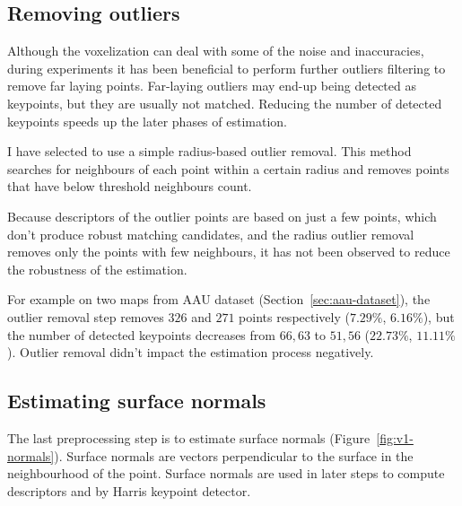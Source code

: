 \subsection{Removing outliers}
\label{sec:outlier-removal}

Although the voxelization can deal with some of the noise and inaccuracies, during experiments it has been beneficial to perform further outliers filtering to remove far laying points. Far-laying outliers may end-up being detected as keypoints, but they are usually not matched. Reducing the number of detected keypoints speeds up the later phases of estimation.

I have selected to use a simple radius-based outlier removal. This method searches for neighbours of each point within a certain radius and removes points that have below threshold neighbours count.

Because descriptors of the outlier points are based on just a few points, which don't produce robust matching candidates, and the radius outlier removal removes only the points with few neighbours, it has not been observed to reduce the robustness of the estimation.

For example on two maps from \gls{AAU} dataset (Section~\ref{sec:aau-dataset}), the outlier removal step removes $326$ and $271$ points respectively ($7.29\%$, $6.16\%$), but the number of detected keypoints decreases from $66, 63$ to $51, 56$ ($22.73\%$, $11.11\%$). Outlier removal didn't impact the estimation process negatively.

\subsection{Estimating surface normals}
\label{sec:normal-estimation}

The last preprocessing step is to estimate surface normals (Figure~\ref{fig:v1-normals}). Surface normals are vectors perpendicular to the surface in the neighbourhood of the point. Surface normals are used in later steps to compute descriptors and by Harris keypoint detector.

